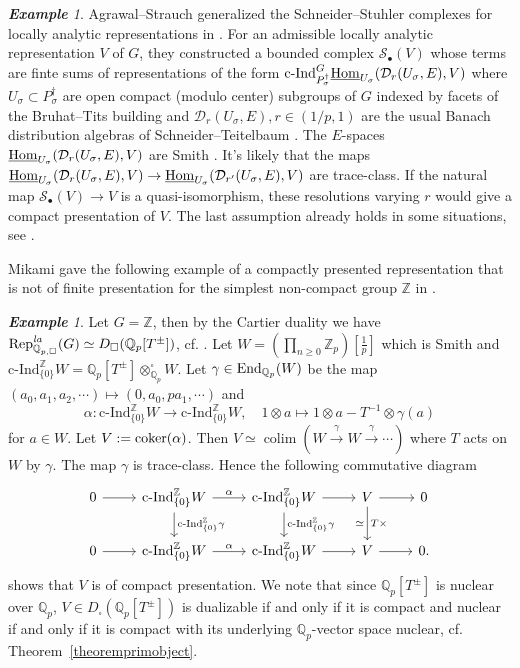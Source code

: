 \documentclass[a4paper,10pt]{amsart}
\theoremstyle{remark}
\newtheorem{example}[theorem]{\bf Example}
\theoremstyle{definition}
\theoremstyle{plain}
\numberwithin{equation}{section}
\newcommand{\bbQ}{{\mathbb Q}}
\newcommand{\bbZ}{{\mathbb Z}}
\newcommand{\calD}{{\mathcal D}}
\newcommand{\calS}{{\mathcal S}}
\newcommand{\coker}{{\rm coker}}
\newcommand{\End}{{\rm End}}
\newcommand{\Hom}{{\rm Hom}}
\newcommand{\uHom}{\underline{\Hom}}
\newcommand{\la}{{\it la}}
\newcommand{\Rep}{{\rm Rep}}
\newcommand{\cInd}{\mathrm{c\text{-}Ind}}
\DeclareMathOperator{\colim}{colim}
\begin{document}
\begin{example}
	Agrawal--Strauch generalized the Schneider--Stuhler complexes \cite{schneiderStuhler1997representation} for locally analytic representations in \cite{agrawal2024resolutions}. For an admissible locally analytic representation $V$ of $G$, they constructed a bounded complex $\mathcal{S}_{\bullet}(V)$ \cite[Def.~4.13]{agrawal2024resolutions} whose terms are finte sums of representations of the form $\cInd_{P_{\sigma}^{\dagger}}^G\uHom_{U_{\sigma}}(\calD_r(U_{\sigma},E),V)$ \cite[(4.16)]{agrawal2024resolutions} where $U_{\sigma}\subset P_{\sigma}^{\dagger}$ are open compact (modulo center) subgroups of $G$ indexed by facets of the Bruhat--Tits building and $\calD_r(U_{\sigma},E),r\in (1/p,1)$ are the usual Banach distribution algebras of Schneider--Teitelbaum \cite[p.162]{ST03}. The $E$-spaces $\uHom_{U_{\sigma}}(\calD_r(U_{\sigma},E),V)$ are Smith \cite[Prop.~3.25, Prop.~3.20]{agrawal2024resolutions}. It's likely that the maps $\uHom_{U_{\sigma}}(\calD_r(U_{\sigma},E),V)\rightarrow \uHom_{U_{\sigma}}(\calD_{r'}(U_{\sigma},E),V)$ are trace-class. If the natural map $\calS_{\bullet}(V)\rightarrow V$ is a quasi-isomorphism, these resolutions varying $r$ would give a compact presentation of $V$. The last assumption already holds in some situations, see \cite[\S~4.18]{agrawal2024resolutions}.
\end{example}
Mikami gave the following example of a compactly presented representation that is not of finite presentation for the simplest non-compact group $\bbZ$  in \cite[Exam.~A.2]{mikami2026relativelydiscrete}.
\begin{example}
	Let $G=\bbZ$, then by the Cartier duality we have $\Rep^{\la}_{\bbQ_{p,\square}}(G)\simeq D_{\square}(\bbQ_p[T^{\pm}])$, cf. \cite[Thm.~4.4.4]{JC23}. Let $W=(\prod_{n\geq 0}\bbZ_p)[\frac{1}{p}]$ which is Smith and $\cInd_{\{0\}}^{\bbZ}W=\bbQ_p[T^{\pm}]\otimes_{\bbQ_p}^{\square}W$. Let $\gamma\in \End_{\bbQ_p}(W)$ be the map $ (a_0,a_1,a_2,\cdots)\mapsto (0,a_0,pa_1,\cdots)$ and 
	\[\alpha: \cInd_{\{0\}}^{\bbZ}W\to \cInd_{\{0\}}^{\bbZ}W,\quad	1\otimes a\mapsto 1\otimes a-T^{-1}\otimes \gamma(a)\] 
	for $a\in W$. Let $V:=\coker(\alpha)$. Then $V\simeq \colim (W\xrightarrow{\gamma}W\xrightarrow{\gamma}\cdots)$ where $T$ acts on $W$ by $\gamma$. The map $\gamma$ is trace-class. Hence the following commutative diagram
	\begin{equation*}
		\begin{tikzcd}0 \arrow[r] &\cInd_{\{0\}}^{\bbZ}W\arrow[r,"\alpha"] \arrow[d, "\cInd_{\{0\}}^{\bbZ}\gamma"] & \cInd_{\{0\}}^{\bbZ}W \arrow[r] \arrow[d, "\cInd_{\{0\}}^{\bbZ}\gamma"] & V \arrow[r] \arrow[d, "\simeq"',"T\times "] & 0 \\
			0 \arrow[r] & \cInd_{\{0\}}^{\bbZ}W\arrow[r,"\alpha"] &\cInd_{\{0\}}^{\bbZ}W \arrow[r] & V\arrow[r] & 0.
		\end{tikzcd}
	\end{equation*}
	shows that $V$ is of compact presentation. We note that since $\bbQ_p[T^{\pm}]$ is nuclear over $\bbQ_p$, $V\in D_{\square}(\bbQ_p[T^{\pm}])$ is dualizable if and only if it is compact and nuclear if and only if it is compact with its underlying $\bbQ_p$-vector space nuclear, cf. Theorem~\ref{theoremprimobject}.
\end{example}
\end{document}
